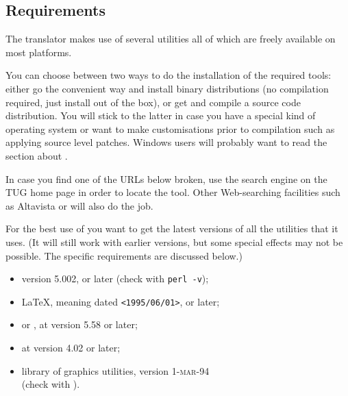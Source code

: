 \startdocument
%
\label{sec:sup}
\subsection{Requirements}%
\html{\\}%
The translator makes use of several utilities all of which 
are freely available on most platforms. 

You can choose between two ways to do the installation of the required
tools: either go the convenient way and install binary distributions
(no compilation required, just install out of the box), or get and
compile a source code distribution.
You will stick to the latter in case you have a special kind of
operating system or want to make customisations prior to compilation
such as applying source level patches.
Windows users will probably want to read the section about
.

In case you find one of the URLs below broken, use the search
engine on the TUG home page \CTANtug{} in order to locate the tool.
Other Web-searching facilities such as Altavista or %
will also do the job.

\medskip\noindent
For the best use of \latextohtml{} you want to get the latest
versions of all the utilities that it uses. (It will still work
with earlier versions, but some  special effects may not be possible. 
The specific requirements are discussed below.)
%
\begin{itemize}
\item \Perl{} version 5.002, or later (check with \verb/perl -v/);
\item \LaTeX, meaning \LaTeXe{} dated \texttt{<1995/06/01>}, or later;
\item {} or , at version 5.58 or later;
\item {} at version 4.02 or later;
\item {} library of graphics utilities, version \textsc{1-mar-94}\\
  (check with  ).
\end{itemize}

